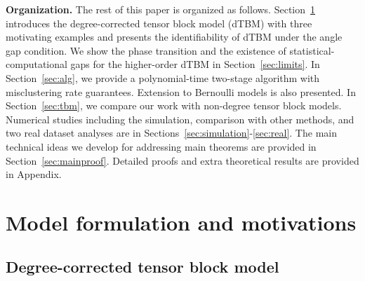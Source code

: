 \documentclass[journal]{IEEEtran}
\theoremstyle{definition}
\theoremstyle{definition}
\begin{document}
{\bf Organization.} The rest of this paper is organized as follows. Section~\ref{sec:model} introduces the degree-corrected tensor block model (dTBM) with three motivating examples and presents the identifiability of dTBM under the angle gap condition. We show the phase transition and the existence of statistical-computational gaps for the higher-order dTBM in Section~\ref{sec:limits}. In Section~\ref{sec:alg}, we provide a polynomial-time two-stage algorithm with misclustering rate guarantees. { Extension to Bernoulli models is also presented. In Section~\ref{sec:tbm}, we compare our work with non-degree tensor block models.} Numerical studies including the simulation, comparison with other methods, and two real dataset analyses are in Sections~\ref{sec:simulation}-\ref{sec:real}. The main technical ideas we develop for addressing main theorems are provided in Section~\ref{sec:mainproof}. Detailed proofs and extra theoretical results are provided in Appendix.



\section{Model formulation and motivations}\label{sec:model}


\subsection{Degree-corrected tensor block model}
\end{document}
